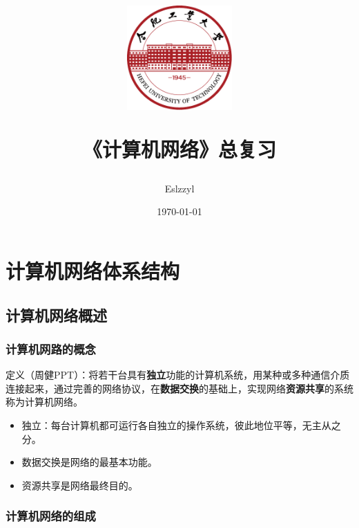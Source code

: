 \documentclass[12pt, a4paper, oneside]{ctexart}
\title{
    \includegraphics[width=0.3\textwidth]{images/hfut-badge.pdf}
    
    \vspace{20pt}
    《计算机网络》总复习
}
\author{Eslzzyl}
\date{\today}
\begin{document}
\maketitle
\newpage
\tableofcontents
\vspace{20pt}

\newpage

\section{计算机网络体系结构}

\subsection{计算机网络概述}

\subsubsection{计算机网路的概念}

定义（周健PPT）：将若干台具有\textbf{独立}功能的计算机系统，用某种或多种通信介质连接起来，通过完善的网络协议，在\textbf{数据交换}的基础上，实现网络\textbf{资源共享}的系统称为计算机网络。 

\begin{itemize}
    \item 独立：每台计算机都可运行各自独立的操作系统，彼此地位平等，无主从之分。
    \item 数据交换是网络的最基本功能。
    \item 资源共享是网络最终目的。
\end{itemize}

\subsubsection{计算机网络的组成}
\end{document}
